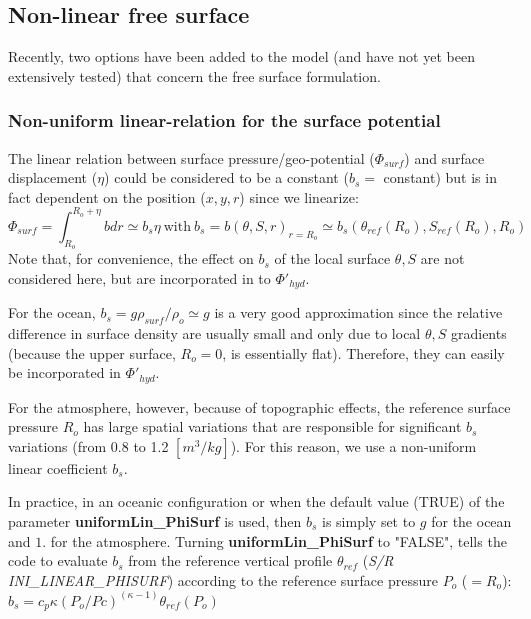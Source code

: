 


\subsection{Non-linear free surface}

Recently, two options have been added to the model (and have not yet
been extensively tested) that concern the free surface formulation.


\subsubsection{Non-uniform linear-relation for the surface potential}

The linear relation between surface pressure/geo-potential
($\Phi_{surf}$) and surface displacement ($\eta$) could be considered
to be a constant ($b_s=$ constant)
but is in fact dependent on the position ($x,y,r$)
since we linearize:
$$\Phi_{surf}=\int_{R_o}^{R_o+\eta} b dr \simeq b_s \eta
~\mathrm{with}~ b_s = b(\theta,S,r)_{r=R_o} 
\simeq b_s(\theta_{ref}(R_o),S_{ref}(R_o),R_o)$$
Note that, for convenience, the effect on $b_s$ of the local surface
$\theta,S$ are not considered here, but are incorporated in to
$\Phi'_{hyd}$.

For the ocean, $b_s = g \rho_{surf} / \rho_o \simeq g$ is a very good
approximation since the relative difference in surface density are
usually small and only due to local $\theta,S$ gradients (because the
upper surface, $R_o = 0$, is essentially flat). Therefore, they can
easily be incorporated in $\Phi'_{hyd}$.

For the atmosphere, however, because of topographic effects, the
reference surface pressure $R_o$ has large spatial variations that
are responsible for significant $b_s$ variations (from 0.8 to 1.2
$[m^3/kg]$). For this reason, we use a non-uniform linear coefficient
$b_s$.

In practice, in an oceanic configuration or when the default value
(TRUE) of the parameter {\bf uniformLin\_PhiSurf} is used, then $b_s$
is simply set to $g$ for the ocean and $1.$ for the atmosphere.
Turning {\bf uniformLin\_PhiSurf} to "FALSE", tells the code to
evaluate $b_s$ from the reference vertical profile $\theta_{ref}$
({\it S/R INI\_LINEAR\_PHISURF}) according to the reference surface
pressure $P_o$ ($=R_o$): $b_s = c_p \kappa (P_o / Pc)^{(\kappa - 1)}
\theta_{ref}(P_o)$


